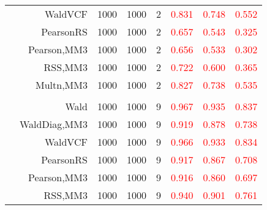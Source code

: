\documentclass[
]{article}
\begin{document}
\begin{table}[H]
{\begin{tabular}[t]{lrrrrrrr}
\hspace{1em} & WaldVCF & 1000 & 1000 & 2 & \textcolor{red}{0.831} & \textcolor{red}{0.748} & \textcolor{red}{0.552}\\

\hspace{1em} & PearsonRS & 1000 & 1000 & 2 & \textcolor{red}{0.657} & \textcolor{red}{0.543} & \textcolor{red}{0.325}\\

\hspace{1em} & Pearson,MM3 & 1000 & 1000 & 2 & \textcolor{red}{0.656} & \textcolor{red}{0.533} & \textcolor{red}{0.302}\\

\hspace{1em} & RSS,MM3 & 1000 & 1000 & 2 & \textcolor{red}{0.722} & \textcolor{red}{0.600} & \textcolor{red}{0.365}\\

\hspace{1em} & Multn,MM3 & 1000 & 1000 & 2 & \textcolor{red}{0.827} & \textcolor{red}{0.738} & \textcolor{red}{0.535}\\
\cmidrule{1-8}
\addlinespace[0.3em]
\multicolumn{8}{l}{\textbf{1F 15V}}\\
\hspace{1em} & Wald & 1000 & 1000 & 9 & \textcolor{red}{0.967} & \textcolor{red}{0.935} & \textcolor{red}{0.837}\\

\hspace{1em} & WaldDiag,MM3 & 1000 & 1000 & 9 & \textcolor{red}{0.919} & \textcolor{red}{0.878} & \textcolor{red}{0.738}\\

\hspace{1em} & WaldVCF & 1000 & 1000 & 9 & \textcolor{red}{0.966} & \textcolor{red}{0.933} & \textcolor{red}{0.834}\\

\hspace{1em} & PearsonRS & 1000 & 1000 & 9 & \textcolor{red}{0.917} & \textcolor{red}{0.867} & \textcolor{red}{0.708}\\

\hspace{1em} & Pearson,MM3 & 1000 & 1000 & 9 & \textcolor{red}{0.916} & \textcolor{red}{0.860} & \textcolor{red}{0.697}\\

\hspace{1em} & RSS,MM3 & 1000 & 1000 & 9 & \textcolor{red}{0.940} & \textcolor{red}{0.901} & \textcolor{red}{0.761}\\


\end{tabular}}
\end{table}
\end{document}
